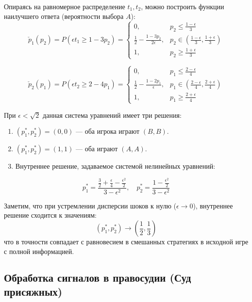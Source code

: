 \begin{example}
Опираясь на равномерное распределение $t_1, t_2$, можно построить функции наилучшего ответа (вероятности выбора $A$):
\begin{equation}
\check{p}_1(p_2) = P(\epsilon t_1 \ge 1 - 3p_2) = 
\begin{cases}
0, & p_2 \le \frac{1-\epsilon}{3} \\
\frac{1}{2} - \frac{1-3p_2}{2\epsilon}, & p_2 \in \left(\frac{1-\epsilon}{3}, \frac{1+\epsilon}{3}\right) \\
1, & p_2 \ge \frac{1+\epsilon}{3}
\end{cases}
\end{equation}

\begin{equation}
\check{p}_2(p_1) = P(\epsilon t_2 \ge 2 - 4p_1) = 
\begin{cases}
0, & p_1 \le \frac{2-\epsilon}{4} \\
\frac{1}{2} - \frac{1-2p_1}{\epsilon}, & p_1 \in \left(\frac{2-\epsilon}{4}, \frac{2+\epsilon}{4}\right) \\
1, & p_1 \ge \frac{2+\epsilon}{4}
\end{cases}
\end{equation}

При $\epsilon < \sqrt{2}$ данная система уравнений имеет три решения:
\begin{enumerate}
    \item $(p_1^*, p_2^*) = (0, 0)$ — оба игрока играют $(B, B)$.
    \item $(p_1^*, p_2^*) = (1, 1)$ — оба играют $(A, A)$.
    \item Внутреннее решение, задаваемое системой нелинейных уравнений:
\end{enumerate}
\begin{equation}
p_1^* = \frac{\frac{3}{2} + \frac{\epsilon}{4} - \frac{\epsilon^2}{2}}{3 - \epsilon^2}, \quad p_2^* = \frac{1 - \frac{\epsilon^2}{2}}{3 - \epsilon^2}
\end{equation}

Заметим, что при устремлении дисперсии шоков к нулю ($\epsilon \to 0$), внутреннее решение сходится к значениям:
\begin{equation}
(p_1^*, p_2^*) \to \left(\frac{1}{2}, \frac{1}{3}\right)
\end{equation}
что в точности совпадает с равновесием в смешанных стратегиях в исходной игре с полной информацией.
\end{example}

\subsection{Обработка сигналов в правосудии (Суд присяжных)}

